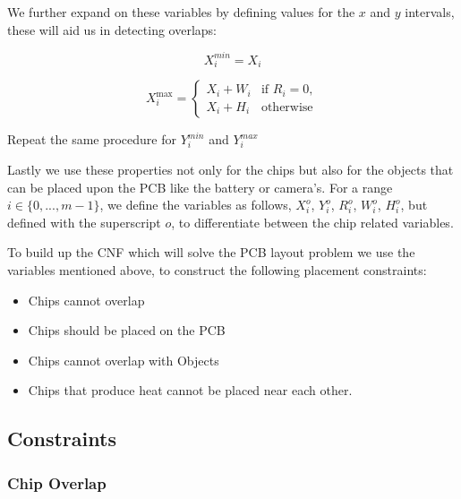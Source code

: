         We further expand on these variables by defining values for the $x$ and
        $y$ intervals, these will aid us in detecting overlaps:
        
        $$X_i^{min} = X_i$$

        $$
        X^{\max}_{i} = \begin{cases} 
            X_i + W_i & \text{if } R_i = 0, \\
            X_i + H_i & \text{otherwise}
        \end{cases}
        $$

        Repeat the same procedure for $Y^{min}_i$ and $Y^{max}_{i}$

        Lastly we use these properties not only for the chips but also for the
        objects that can be placed upon the PCB like the battery or camera's.
        For a range $i \in \{0, ..., m-1\}$, we define the variables as
        follows, $X_i^o$, $Y_i^o$, $R_i^o$, $W_i^o$, $H_i^o$, but defined with
        the superscript $o$, to differentiate between the chip related
        variables.

        To build up the CNF which will solve the PCB layout problem we use the
        variables mentioned above, to construct the following placement
        constraints:

        \begin{itemize}
            \item Chips cannot overlap
            \item Chips should be placed on the PCB
            \item Chips cannot overlap with Objects
            \item Chips that produce heat cannot be placed near each other.
        \end{itemize}

    \subsection{Constraints}
        
        \subsubsection{Chip Overlap}

